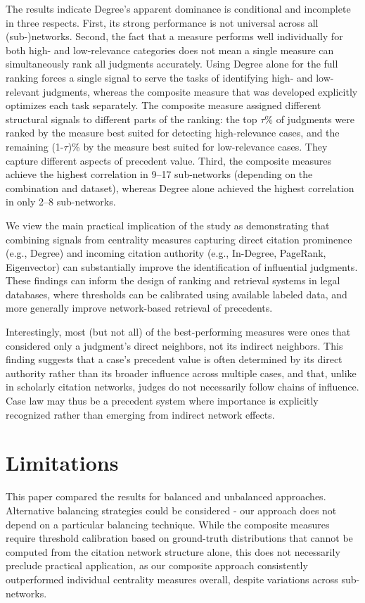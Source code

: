 \documentclass[sigconf]{acmart}
\begin{document}
The results indicate Degree's apparent dominance is conditional and incomplete in three respects. First, its strong performance is not universal across all (sub-)networks. Second, the fact that a measure performs well individually for both high- and low-relevance categories does not mean a single measure can simultaneously rank all judgments accurately. Using Degree alone for the full ranking forces a single signal to serve the tasks of identifying high- and low-relevant judgments, whereas the composite measure that was developed explicitly optimizes each task separately. The composite measure assigned different structural signals to different parts of the ranking: the top $\tau$\% of judgments were ranked by the measure best suited for detecting high-relevance cases, and the remaining (1-$\tau$)\% by the measure best suited for low-relevance cases. They capture different aspects of precedent value. Third, the composite measures achieve the highest correlation in 9–17 sub-networks (depending on the combination and dataset), whereas Degree alone achieved the highest correlation in only 2–8 sub-networks.

We view the main practical implication of the study as demonstrating that combining signals from centrality measures capturing direct citation prominence (e.g., Degree) and incoming citation authority (e.g., In-Degree, PageRank, Eigenvector) can substantially improve the identification of influential judgments. These findings can inform the design of ranking and retrieval systems in legal databases, where thresholds can be calibrated using available labeled data, and more generally improve network-based retrieval of precedents.

Interestingly, most (but not all) of the best-performing measures were ones that considered only a judgment's direct neighbors, not its indirect neighbors. This finding suggests that a case's precedent value is often determined by its direct authority rather than its broader influence across multiple cases, and that, unlike in scholarly citation networks, judges do not necessarily follow chains of influence. Case law may thus be a precedent system where importance is explicitly recognized rather than emerging from indirect network effects.


\section{Limitations}

This paper compared the results for balanced and unbalanced approaches. Alternative balancing strategies could be considered - our approach does not depend on a particular balancing technique.
While the composite measures require threshold calibration based on ground-truth distributions that cannot be computed from the citation network structure alone, this does not necessarily preclude practical application, as our composite approach consistently outperformed individual centrality measures overall, despite variations across sub-networks.
\end{document}
